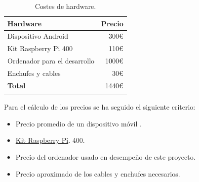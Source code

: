 \begin{longtable}[]{@{}lr@{}}
\toprule
\begin{minipage}[b]{0.38\columnwidth}\raggedright\strut
\textbf{Hardware}\strut
\end{minipage} & \begin{minipage}[b]{0.20\columnwidth}\raggedright\strut
\textbf{Precio}\strut
\end{minipage}\tabularnewline
\midrule
\endhead
\begin{minipage}[t]{0.38\columnwidth}\raggedright\strut
Dispositivo Android\strut
\end{minipage} & \begin{minipage}[t]{0.20\columnwidth}\raggedright\strut
300\euro{}\strut
\end{minipage}\tabularnewline
\begin{minipage}[t]{0.38\columnwidth}\raggedright\strut
Kit Raspberry Pi 400\strut
\end{minipage} & \begin{minipage}[t]{0.20\columnwidth}\raggedright\strut
110\euro{}\strut
\end{minipage}\tabularnewline
\begin{minipage}[t]{0.38\columnwidth}\raggedright\strut
Ordenador para el desarrollo\strut
\end{minipage} & \begin{minipage}[t]{0.20\columnwidth}\raggedright\strut
1000\euro{}\strut
\end{minipage}\tabularnewline
\begin{minipage}[t]{0.38\columnwidth}\raggedright\strut
Enchufes y cables\strut
\end{minipage} & \begin{minipage}[t]{0.20\columnwidth}\raggedright\strut
30\euro{}\strut
\end{minipage}\tabularnewline
\midrule
\begin{minipage}[t]{0.38\columnwidth}\raggedright\strut
\textbf{Total}\strut
\end{minipage} & \begin{minipage}[t]{0.20\columnwidth}\raggedright\strut
1440\euro{}\strut
\end{minipage}\tabularnewline
\bottomrule
\caption{Costes de hardware.}
\end{longtable}

Para el cálculo de los precios se ha seguido el siguiente criterio:

\begin{itemize}
\item
	Precio promedio de un dispositivo móvil \cite{art:pricesmartphone}.
\item
	\href{https://www.kubii.es/raspberry-pi-400/3084-kit-raspberry-pi-400-3272496302914.html#/305-version-version_inglesa?src=raspberrypi}{Kit Raspberry Pi}. 400.
\item
	Precio del ordenador usado en desempeño de este proyecto.
\item
	Precio aproximado de los cables y enchufes necesarios.
\end{itemize}

